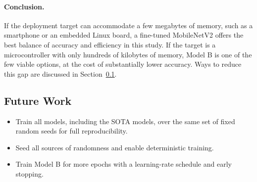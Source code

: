 \documentclass[12pt,a4paper]{article}
\begin{document}
\paragraph{Conclusion.}
If the deployment target can accommodate a few megabytes of memory, such
as a smartphone or an embedded Linux board, a fine-tuned MobileNetV2 offers
the best balance of accuracy and efficiency in this study. If the target
is a microcontroller with only hundreds of kilobytes of memory, Model B
is one of the few viable options, at the cost of substantially lower
accuracy. Ways to reduce this gap are discussed in
Section~\ref{sec:future_work}.

\subsection{Future Work}
\label{sec:future_work}

\begin{itemize}
    \item Train all models, including the SOTA models, over the same set of fixed random seeds for full reproducibility.
    \item Seed all sources of randomness and enable deterministic training.
    \item Train Model B for more epochs with a learning-rate schedule and early stopping.
  
\end{itemize}

\end{document}
